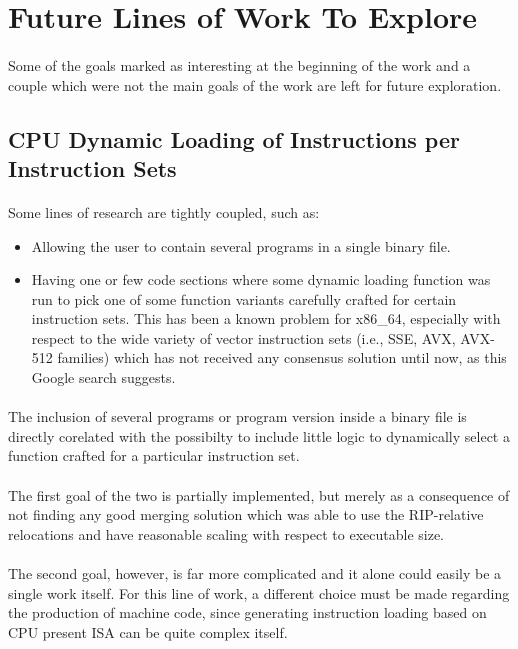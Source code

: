 \documentclass[12pt]{article}
\begin{document}
	\section{Future Lines of Work To Explore}
	\paragraph{}Some of the goals marked as interesting at the beginning of the work and a couple which were not the main goals of the work are left for future exploration.
	
	\subsection{CPU Dynamic Loading of Instructions per Instruction Sets}
	\paragraph{}Some lines of research are tightly coupled, such as:
	\begin{itemize}
		\item Allowing the user to contain several programs in a single binary file.
		\item Having one or few code sections where some dynamic loading function was run to pick one of some function variants carefully crafted for certain instruction sets. This has been a known problem for x86\_64, especially with respect to the wide variety of vector instruction sets (i.e., \acrshort{SSE}, \acrshort{AVX}, AVX-512 families) which has not received any consensus solution until now, as this Google search suggests\cite{cpu-dispatch}.
	\end{itemize}
	\paragraph{}The inclusion of several programs or program version inside a binary file is directly corelated with the possibilty to include little logic to dynamically select a function crafted for a particular instruction set.
	\paragraph{}The first goal of the two is partially implemented, but merely as a consequence of not finding any good merging solution which was able to use the \gls{RIP}-relative relocations and have reasonable scaling with respect to executable size.
	\paragraph{}The second goal, however, is far more complicated and it alone could easily be a single work itself. For this line of work, a different choice must be made regarding the production of machine code, since generating instruction loading based on CPU present \acrshort{ISA} can be quite complex itself.
	
\end{document}
